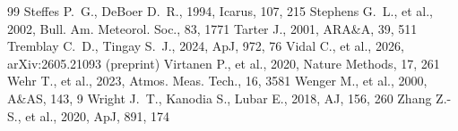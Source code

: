 \documentclass[twocolumn,twocolappendix,numberedappendix,appendixfloats]{openjournal}
\begin{document}
\begin{thebibliography}{99}
 Steffes P.~G., DeBoer D.~R., 1994, Icarus, 107, 215
 Stephens G.~L., et al., 2002, Bull. Am. Meteorol. Soc., 83, 1771
 Tarter J., 2001, ARA\&A, 39, 511
 Tremblay C.~D., Tingay S.~J., 2024, ApJ, 972, 76
 Vidal C., et al., 2026, arXiv:2605.21093 (preprint)
 Virtanen P., et al., 2020, Nature Methods, 17, 261
 Wehr T., et al., 2023, Atmos. Meas. Tech., 16, 3581
 Wenger M., et al., 2000, A\&AS, 143, 9
 Wright J.~T., Kanodia S., Lubar E., 2018, AJ, 156, 260
 Zhang Z.-S., et al., 2020, ApJ, 891, 174
\end{thebibliography}
\end{document}
